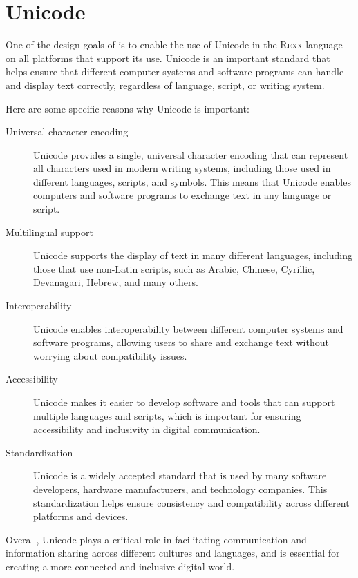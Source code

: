 \chapter{Unicode}
One of the design goals of \crexx{} is to enable the use of Unicode in
the \textsc{Rexx} language on all
platforms that support its use. 
Unicode is an important standard that helps ensure that different computer systems and software programs can handle and display text correctly, regardless of language, script, or writing system.

Here are some specific reasons why Unicode is important:
\begin{description}
\item[Universal character encoding] Unicode provides a single, universal character encoding that can represent all characters used in modern writing systems, including those used in different languages, scripts, and symbols. This means that Unicode enables computers and software programs to exchange text in any language or script.
\item[Multilingual support] Unicode supports the display of text in many different languages, including those that use non-Latin scripts, such as Arabic, Chinese, Cyrillic, Devanagari, Hebrew, and many others.
\item[Interoperability] Unicode enables interoperability between different computer systems and software programs, allowing users to share and exchange text without worrying about compatibility issues.
\item[Accessibility] Unicode makes it easier to develop software and tools that can support multiple languages and scripts, which is important for ensuring accessibility and inclusivity in digital communication.
\item[Standardization] Unicode is a widely accepted standard that is
  used by many software developers, hardware manufacturers, and
  technology companies. This standardization helps ensure consistency
  and compatibility across different platforms and devices.
\end{description}
Overall, Unicode plays a critical role in facilitating communication
and information sharing across different cultures and languages, and
is essential for creating a more connected and inclusive digital
world.
